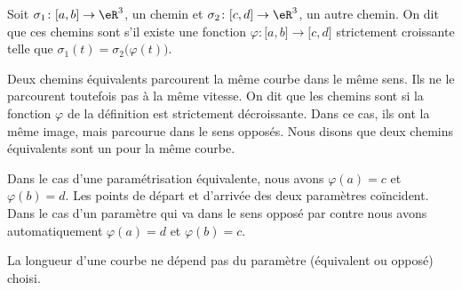 \begin{definition}
    Soit $\sigma_1\colon \mathopen[ a , b \mathclose]\to \eR^3$, un chemin et $\sigma_2\colon \mathopen[ c , d \mathclose]\to \eR^3$, un autre chemin. On dit que ces chemins sont  s'il existe une fonction $\varphi\colon \mathopen[ a , b \mathclose]\to \mathopen[ c , d \mathclose]$ strictement croissante telle que $\sigma_1(t)=\sigma_2\big( \varphi(t) \big)$.
\end{definition}

Deux chemins équivalents parcourent la même courbe dans le même sens. Ils ne le parcourent toutefois pas à la même vitesse. On dit que les chemins sont  si la fonction $\varphi$ de la définition est strictement décroissante. Dans ce cas, ils ont la même image, mais parcourue dans le sens opposés. Nous disons que deux chemins équivalents sont un  pour la même courbe.

 Dans le cas d'une paramétrisation équivalente, nous avons $\varphi(a)=c$ et $\varphi(b)=d$. Les points de départ et d'arrivée des deux paramètres coïncident. Dans le cas d'un paramètre qui va dans le sens opposé par contre nous avons automatiquement $\varphi(a)=d$ et $\varphi(b)=c$.

\begin{proposition}
    La longueur d'une courbe ne dépend pas du paramètre (équivalent ou opposé) choisi.
\end{proposition}

